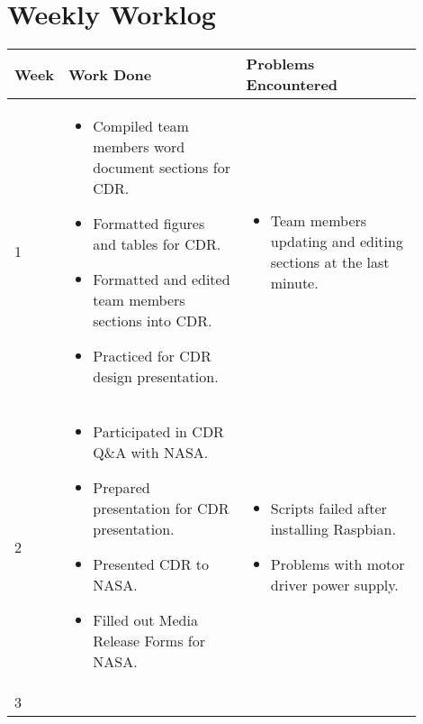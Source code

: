 \documentclass[onecolumn, draftclsnofoot,10pt, compsoc]{IEEEtran}
\newenvironment{myitemize}
{ \begin{itemize}
    \setlength{\itemsep}{0pt}
    \setlength{\parskip}{0pt}
    \setlength{\parsep}{0pt}     }
{ \end{itemize}                  }
\begin{document}
\section{Weekly Worklog}
\begin{singlespacing}
\begin{tabular} {l p{0.45\linewidth} p{0.45\linewidth}} \textbf{Week} & \textbf{Work Done} & \textbf{Problems Encountered}\\\hline
1 &
\vspace{-\baselineskip}\begin{myitemize}
\item Compiled team members word document sections for CDR.
\item Formatted figures and tables for CDR.
\item Formatted and edited team members sections into CDR.
\item Practiced for CDR design presentation. 
\vspace{-\baselineskip}\end{myitemize} & 
\vspace{-\baselineskip}\begin{myitemize}
\item Team members updating and editing sections at the last minute.
\vspace{-\baselineskip}\end{myitemize} \\\hline
2 &
\vspace{-\baselineskip}\begin{myitemize}
\item Participated in CDR Q\&A with NASA.
\item Prepared presentation for CDR presentation.
\item Presented CDR to NASA.
\item Filled out Media Release Forms for NASA.
\vspace{-\baselineskip}\end{myitemize} & 
\vspace{-\baselineskip}\begin{myitemize}
\item Scripts failed after installing Raspbian.
\item Problems with motor driver power supply.
\vspace{-\baselineskip}\end{myitemize} \\\hline
3 &
\vspace{-\baselineskip}\begin{myitemize}

\end{myitemize}
\end{tabular}
\end{singlespacing}
\end{document}
